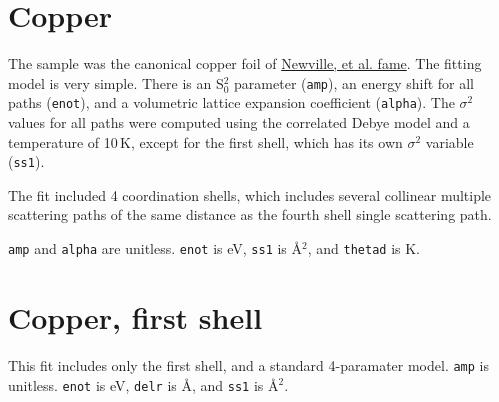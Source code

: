 \documentclass{article}
\let\stdsection\section
\renewcommand\section{\newpage\stdsection}
\begin{document}
\section{Copper}

\normalsize The sample was the canonical copper foil of
\href{https://github.com/XraySpectroscopy/XAS-Data-Interchange/issues/29}{Newville,
  et al. fame}.  The fitting model is very simple.  There is an
S$_0^2$ parameter (\texttt{amp}), an energy shift for all paths
(\texttt{enot}), and a volumetric lattice expansion coefficient
(\texttt{alpha}).  The $\sigma^2$ values for all paths were computed
using the correlated Debye model and a temperature of 10\,K, except
for the first shell, which has its own $\sigma^2$ variable
(\texttt{ss1}).

The fit included 4 coordination shells, which includes several
collinear multiple scattering paths of the same distance as the fourth
shell single scattering path.

\texttt{amp} and \texttt{alpha} are unitless.  \texttt{enot} is eV,
\texttt{ss1} is \AA$^2$, and \texttt{thetad} is K.


\def\feffmaterial{Copper}       %
\def\feffrone{3}                %
\def\feffrtwo{4}                %
\def\feffrthree{5}              %
\def\feffrfour{5.5}             %
\def\feffrfive{6}               %
\def\fefffirst{}                %

\small

\fitplots



\section{Copper, first shell}

\normalsize
This fit includes only the first shell, and a standard 4-paramater
model.  \texttt{amp} is unitless.  \texttt{enot} is eV, \texttt{delr}
is \AA, and \texttt{ss1} is \AA$^2$.

\def\fefffirst{_1st}

\small

\fitplots



\end{document}

